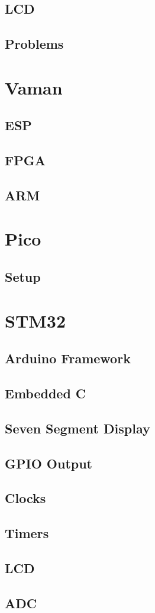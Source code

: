 \documentclass[journal]{IEEEtran}
\begin{document}
\subsection{LCD}

\subsection{Problems}

\newpage
\section{Vaman}
\subsection{ESP}
%

\subsection{FPGA}

\subsection{ARM}

\newpage
\section{Pico}
\subsection{Setup}

\newpage
\section{STM32}
\subsection{Arduino Framework}

\subsection{Embedded C}

\subsection{Seven Segment Display}

\subsection{GPIO Output}

\subsection{Clocks}

\subsection{Timers}

\subsection{LCD}

\subsection{ADC}

%
\end{document}
